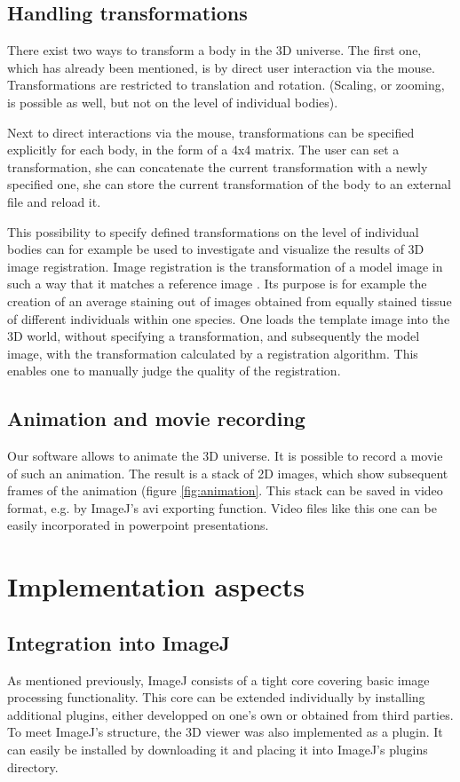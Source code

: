 \documentclass[a4paper,10pt]{article}
\begin{document}
\subsection{Handling transformations}
There exist two ways to transform a body in the 3D universe. The first one, which has already been mentioned, is by direct user interaction via the mouse. Transformations are restricted to translation and rotation. (Scaling, or zooming, is possible as well, but not on the level of individual bodies).

Next to direct interactions via the mouse, transformations can be specified explicitly for each body, in the form of a 4x4 matrix. The user can set a transformation, she can concatenate the current transformation with a newly specified one, she can store the current transformation of the body to an external file and reload it.

This possibility to specify defined transformations on the level of individual bodies can for example be used to investigate and visualize the results of 3D image registration. Image registration is the transformation of a model image in such a way that it matches a reference image \cite{jenett2006}. Its purpose is for example the creation of an average staining out of images obtained from equally stained tissue of different individuals within one species. One loads the template image into the 3D world, without specifying a transformation, and subsequently the model image, with the transformation calculated by a registration algorithm. This enables one to manually judge the quality of the registration.

\subsection{Animation and movie recording}
Our software allows to animate the 3D universe. It is possible to record a movie of such an animation. The result is a stack of 2D images, which show subsequent frames of the animation (figure \ref{fig:animation}. This stack can be saved in video format, e.g. by ImageJ's avi exporting function. Video files like this one can be easily incorporated in powerpoint presentations.



\section{Implementation aspects}
\subsection*{Integration into ImageJ}
As mentioned previously, ImageJ consists of a tight core covering basic image processing functionality. This core can be extended individually by installing additional plugins, either developped on one's own or obtained from third parties.
To meet ImageJ's structure, the 3D viewer was also implemented as a plugin. It can easily be installed by downloading it and placing it into ImageJ's plugins directory.
\end{document}
